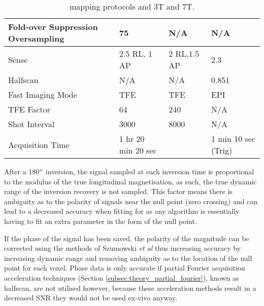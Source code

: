 \begin{table}[H]
\begin{tabularx}{1.0\textwidth}{|X|X|X|X|}
		Fold-over Suppression   Oversampling & 75                                                 & N/A                                                & N/A                                                                \\ \hline
		Sense                                & 2.5 RL, 1 AP                                       & 2 RL,1.5 AP                                        & 2.3                                                                \\ \hline
		Halfscan                             & N/A                                                & N/A                                                & 0.851                                                              \\ \hline
		Fast Imaging Mode                    & TFE                                                & TFE                                                & EPI                                                                \\ \hline
		TFE Factor                           & 64                                                 & 240                                                & N/A                                                                \\ \hline
		Shot Interval                        & 3000                                               & 8000                                               & N/A                                                                \\ \hline
		Acquisition Time                     & 1 hr 20 min 20 sec                                 &                                                    & 1 min 10 sec (Trig)                                                \\ \hline
	\end{tabularx}
	\caption{\tone mapping protocols and 3T and 7T.}
	\label{tab:ex_t1_mapping}
\end{table}

After a 180$\degree$ inversion, the signal sampled at each inversion time is proportional to the modulus of the true longitudinal magnetisation, as such, the true dynamic range of the inversion recovery is not sampled. This factor means there is ambiguity as to the polarity of signals near the null point (zero crossing) and can lead to a decreased accuracy when fitting for \tone as any algorithm is essentially having to fit an extra parameter in the form of the null point. 

If the phase of the signal has been saved, the polarity of the magnitude can be corrected using the methods of Szumowski \textit{et al} \cite{szumowski_signal_2012} thus increasing accuracy by increasing dynamic range and removing ambiguity as to the location of the null point for each voxel. Phase data is only accurate if partial Fourier acquisition acceleration techniques (Section \ref{subsec:theory_partial_fourier}), known as halfscan, are not utilised however, because these acceleration methods result in a decreased \ac{SNR} they would not be used ex-vivo anyway.

